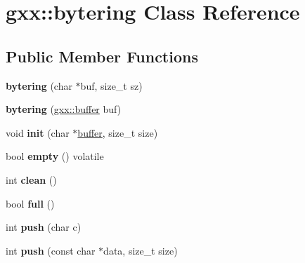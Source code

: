 \hypertarget{classgxx_1_1bytering}{}\section{gxx\+:\+:bytering Class Reference}
\label{classgxx_1_1bytering}
\subsection*{Public Member Functions}
\begin{DoxyCompactItemize}
\item 
{\bfseries bytering} (char $\ast$buf, size\+\_\+t sz)\hypertarget{classgxx_1_1bytering_ae2d328873fd5b03e67383a709bd90826}{}\label{classgxx_1_1bytering_ae2d328873fd5b03e67383a709bd90826}

\item 
{\bfseries bytering} (\hyperlink{classgxx_1_1buffer}{gxx\+::buffer} buf)\hypertarget{classgxx_1_1bytering_a9b8f2cd2c64128653bc8cb96a47c2675}{}\label{classgxx_1_1bytering_a9b8f2cd2c64128653bc8cb96a47c2675}

\item 
void {\bfseries init} (char $\ast$\hyperlink{classgxx_1_1buffer}{buffer}, size\+\_\+t size)\hypertarget{classgxx_1_1bytering_a866ec4e1db4752491af2aaf13ca1271e}{}\label{classgxx_1_1bytering_a866ec4e1db4752491af2aaf13ca1271e}

\item 
bool {\bfseries empty} () volatile\hypertarget{classgxx_1_1bytering_abd8db2cbab231645867d7d4f2b482cf4}{}\label{classgxx_1_1bytering_abd8db2cbab231645867d7d4f2b482cf4}

\item 
int {\bfseries clean} ()\hypertarget{classgxx_1_1bytering_aadcd015c33db152a0539bbc3566474c3}{}\label{classgxx_1_1bytering_aadcd015c33db152a0539bbc3566474c3}

\item 
bool {\bfseries full} ()\hypertarget{classgxx_1_1bytering_a9c038d51bc47c1f9f1158520ac09af7a}{}\label{classgxx_1_1bytering_a9c038d51bc47c1f9f1158520ac09af7a}

\item 
int {\bfseries push} (char c)\hypertarget{classgxx_1_1bytering_ab08e8df59c29e18ee3d2b219697d275e}{}\label{classgxx_1_1bytering_ab08e8df59c29e18ee3d2b219697d275e}

\item 
int {\bfseries push} (const char $\ast$data, size\+\_\+t size)\hypertarget{classgxx_1_1bytering_a0bd8517d3572d3ee95b66abfa3599384}{}\label{classgxx_1_1bytering_a0bd8517d3572d3ee95b66abfa3599384}


\end{DoxyCompactItemize}
